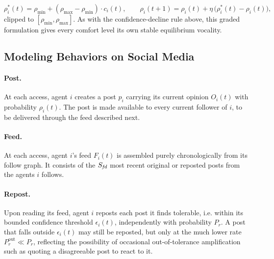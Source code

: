 \documentclass{svproc}
\def\post{\rho}                 %
\def\BoundedConfidence{\epsilon} %
\def\feed{F}                    %
\def\maxfeed{S_{\it fd}}         %
\begin{document}
\begin{equation}
\post_i^{\ast}(t) = \post_{\min} + (\post_{\max}-\post_{\min})\cdot c_i(t), \qquad
\post_i(t{+}1) = \post_i(t) + \eta\,\big(\post_i^{\ast}(t)-\post_i(t)\big),
\end{equation}
clipped to $[\post_{\min},\post_{\max}]$. 
As with the confidence-decline rule above, 
this graded formulation gives every comfort 
level its own stable equilibrium vocality. 

\subsection{Modeling Behaviors on Social Media}\label{sec:model-behaviors}

\paragraph{Post.}
At each access, agent $i$ creates a post $p_i$ carrying
its current opinion $O_i(t)$ with probability $\post_i(t)$.
The post is made available to every current follower
of $i$, to be delivered through the feed
described next.

\paragraph{Feed.}
At each access, agent $i$'s feed $\feed_i(t)$ is
assembled purely chronologically from its follow
graph. It consists of the $\maxfeed$ most recent
original or reposted posts from the agents $i$ follows.

\paragraph{Repost.} 
Upon reading its feed, agent $i$ reposts each 
post it finds tolerable, i.e. within its 
bounded confidence threshold $\BoundedConfidence_i(t)$, 
independently with probability $P_r$. 
A post that falls outside $\BoundedConfidence_i(t)$ 
may still be reposted, but only at the much lower rate 
$P_r^{\mathrm{out}}\ll P_r$, reflecting the 
possibility of occasional out-of-tolerance 
amplification such as quoting a 
disagreeable post to react to it. 
\end{document}
